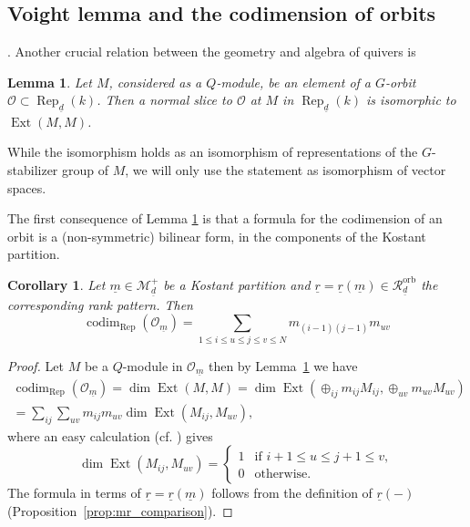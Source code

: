 \documentclass[a4paper]{amsart}
\DeclareMathOperator{\Ext}{Ext}
\DeclareMathOperator{\Rep}{\mathrm{Rep}}
\DeclareMathOperator{\codim}{\mathrm{codim}}
\newcommand{\CO}{\mathcal{O}}
\newcommand{\CR}{\mathcal{R}}
\newcommand{\CM}{\mathcal{M}}
\newcommand{\ur}{\underline{r}}
\newcommand{\um}{\underline{m}}
\newcommand{\ud}{\underline{d}}
\newcommand{\orb}{\mathrm{orb}}
\newtheorem{lemma}[thm]{Lemma}
\newtheorem{cor}[thm]{Corollary}
\theoremstyle{plain}
\begin{document}
\subsection{Voight lemma and the codimension of orbits}\cite{voight}.  \label{sec:voight} 
Another crucial relation between the geometry and algebra of quivers is

\begin{lemma}
    \label{lem:voight}
    Let $M$, considered as a $Q$-module, be an element of a $G$-orbit $\CO \subset \Rep_{\ud}(k)$. Then a normal slice to $\CO$ at $M$ in $\Rep_{\ud}(k)$ is isomorphic to $\Ext(M,M)$.
\end{lemma} 

While the isomorphism holds as an isomorphism of representations of the $G$-stabilizer group of $M$, we will only use the statement as isomorphism of vector spaces. 

The first consequence of Lemma \ref{lem:voight} is that a formula for the codimension of an orbit is a (non-symmetric) bilinear form, in the components of the Kostant partition. 
\begin{cor}
    Let $\um\in\CM_{\ud}^+$ be a Kostant partition and $\ur=\ur(\um)\in \CR^\orb_{\ud}$ the corresponding rank pattern. Then
    \begin{equation}\label{eqn:dim_formula}
    \codim_{\Rep}(\CO_{\um})=\sum_{1\leq i\leq u\leq j\leq v\leq N}m_{(i-1)(j-1)}m_{uv} %
    \end{equation}
\end{cor}
\begin{proof}
Let $M$ be a $Q$-module in $\CO_{\um}$ then by Lemma~\ref{lem:voight} we have
\begin{multline*}
\codim_{\Rep}(\CO_{\um})
=
\dim \Ext(M,M)
=
\dim \Ext( \oplus_{ij} m_{ij}M_{ij}, \oplus_{uv} m_{uv}M_{uv})
\\
=
\sum_{ij}\sum_{uv} m_{ij}m_{uv}\dim \Ext(M_{ij},M_{uv}),
\end{multline*}
where an easy calculation (cf. \cite[Lemma~4.4]{FRduke}) gives 
\begin{equation}\label{eqn:ExtIndecomposables}
\dim \Ext(M_{ij},M_{uv})=
\begin{cases}
    1 & \text{if } i+1\leq u \leq j+1 \leq v, \\
    0 & \text{otherwise.}
\end{cases}
\end{equation}
The formula in terms of $\ur=\ur(\um)$ follows from the definition of $\ur(-)$ (Proposition~\ref{prop:mr_comparison}).
\end{proof}
\end{document}
